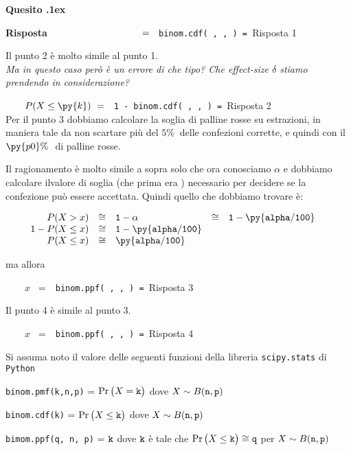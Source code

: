 \documentclass[11pt,twoside,a4paper]{article}
\newcounter{quesito}
\newenvironment{question}{\addtocounter{quesito}{1}\par\textbf{Quesito \thequesito.\kern1ex}}{\vspace{0.5\parskip}}
\newenvironment{answer}{\par\textbf{Risposta\quad}}{\vspace{\parskip}}
\begin{document}
\begin{question}
\begin{answer}
$\qquad\displaystyle
\phantom{P(X\le \py{k})}
\ =\ ${\tt {\color{blue} binom.cdf( , ,  )} = }\hfill  {\color{blue}Risposta 1}




\bigskip
Il punto 2 è molto simile al punto 1.\\ \emph{Ma in questo caso però è un errore di che tipo? Che effect-size $\delta$ stiamo prendendo in considerazione?}

\smallskip
$\qquad P(X\le \py{k})\ =\ ${\tt {\color{blue} 1 - binom.cdf( , ,  )} = }\hfill  {\color{blue}Risposta 2} \\

Per il punto 3 dobbiamo calcolare la soglia di palline rosse su  estrazioni, in maniera tale da non scartare più del $5\% \ $ delle confezioni corrette, e quindi con il $\py{p0}\%\ $ di palline rosse.

Il ragionamento è molto simile a sopra solo che ora conosciamo $\alpha$ e dobbiamo calcolare ilvalore di soglia (che prima era ) necessario per decidere se la confezione può essere accettata. Quindi quello che dobbiamo trovare è:

$\qquad\begin{array}{rclcl}
P(X > x )&\cong&{\tt 1-\alpha} &\cong&{\tt 1-\py{alpha/100}}\\
1-P(X \le x )&\cong&{\tt 1-\py{alpha/100}}\\
P(X \le x )&\cong&{\tt \py{alpha/100}}
\end{array}$

ma allora 

$\displaystyle\qquad
x$
\ =\ {\tt {\color{blue} binom.ppf( , ,  )} = }\hfill  {\color{blue}Risposta 3}

\bigskip
Il punto 4 è simile al punto 3.

$\displaystyle\qquad
x$
\ =\ {\tt {\color{blue} binom.ppf( , ,  )} = }\hfill {\color{blue}Risposta 4}







\end{answer}
\end{question}



\vfill
\hrulefill

Si assuma noto il valore delle seguenti funzioni della libreria {\tt scipy.stats\/} di  {\tt Python\/}

{\tt binom.pmf(k,n,p)} = $\Pr\big(X={\tt k}\big)$ dove $X\sim B({\tt n},{\tt p})$ 

{\tt binom.cdf(k)} = $\Pr\big(X\le{\tt k}\big)$ dove  $X\sim B({\tt n},{\tt p})$ 

{\tt bimom.ppf(q, n, p)} = ${\tt k}$ dove ${\tt k}$ è tale che $\Pr\big(X\le{\tt k}\big)\cong{\tt q}$ per $X\sim B({\tt n},{\tt p})$ 
\end{document}
